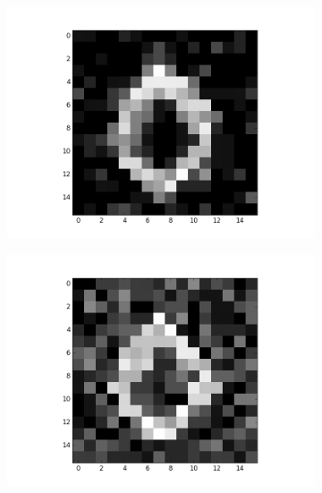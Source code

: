 \begin{figure}[h!]
	
	\begin{subfigure}{.25\textwidth}
  		\centering
  		\includegraphics[width=\linewidth]{imgs/poker/compl12.png}
  		\label{fig:sub1}
	\end{subfigure}%
	\begin{subfigure}{.25\textwidth}
  		\centering
  		\includegraphics[width=\linewidth]{imgs/poker/compl22.png}
  		\label{fig:sub1}
	\end{subfigure}%
	\begin{subfigure}{.25\textwidth}
  		\centering

\end{subfigure}
\end{figure}
